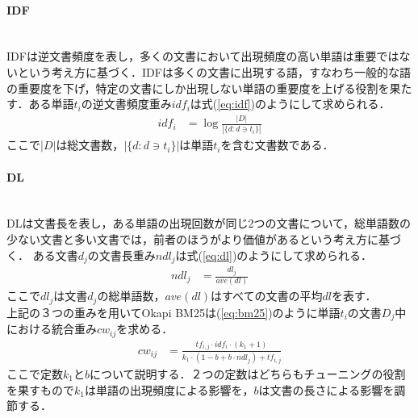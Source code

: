 \paragraph{IDF}\ \\
IDFは逆文書頻度を表し，多くの文書において出現頻度の高い単語は重要ではないという考え方に基づく．IDFは多くの文書に出現する語，すなわち一般的な語の重要度を下げ，特定の文書にしか出現しない単語の重要度を上げる役割を果たす．ある単語$t_i$の逆文書頻度重み$idf_{i}$は式(\ref{eq:idf})のようにして求められる．
\begin{equation}
\begin{aligned}
\label{eq:idf}
idf_{i} & = \log{ \frac{ |D| }{ | \{ d: d \ni t_i \}  |} } %
\end{aligned}
\end{equation}
ここで$|D|$は総文書数，$| \{ d: d \ni t_i \}  |$は単語$t_i$を含む文書数である．
\paragraph{DL}\ \\
DLは文書長を表し，ある単語の出現回数が同じ2つの文書について，総単語数の少ない文書と多い文書では，前者のほうがより価値があるという考え方に基づく．
ある文書$d_j$の文書長重み$ndl_j$は式(\ref{eq:dl})のようにして求められる．
\begin{equation}
\begin{aligned}
\label{eq:dl}
ndl_{j} & = \frac{dl_j}{ave(dl)}
\end{aligned}
\end{equation}
ここで$dl_j$は文書$d_j$の総単語数，$ave(dl)$はすべての文書の平均$dl$を表す．
\\
上記の３つの重みを用いてOkapi BM25は(\ref{eq:bm25})のように単語$t_i$の文書$D_j$中における統合重み$cw_{ij}$を求める．
\begin{equation}
\begin{aligned}
\label{eq:bm25}
cw_{ij} & = \frac{tf_{i,j} \cdot idf_{i} \cdot (k_1+ 1)}{k_1 \cdot (1 - b + b \cdot ndl_{j}  ) + tf_{i,j}  }
\end{aligned}
\end{equation}
ここで定数$k_1$と$b$について説明する．２つの定数はどちらもチューニングの役割を果すもので$k_1$は単語の出現頻度による影響を，$b$は文書の長さによる影響を調節する．
